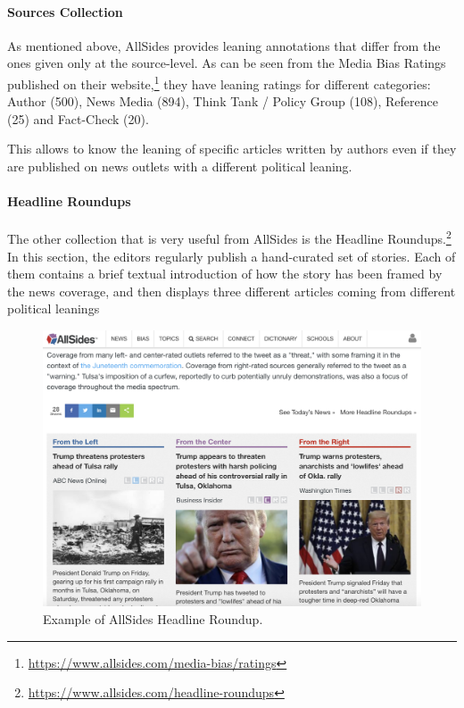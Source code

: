 \paragraph{Sources Collection}

As mentioned above, AllSides provides leaning annotations that differ from  the ones given only at the source-level.
As can be seen from the Media Bias Ratings published on their website,\footnote{\url{https://www.allsides.com/media-bias/ratings}} they have leaning ratings for different categories: Author (500), News Media (894), Think Tank / Policy Group (108), Reference (25) and Fact-Check (20).

This allows to know the leaning of specific articles written by authors even if they are published on news outlets with a different political leaning.


\paragraph{Headline Roundups\texttrademark}

The other collection that is very useful from AllSides is the Headline Roundups\texttrademark.\footnote{\url{https://www.allsides.com/headline-roundups}} In this section, the editors regularly publish a hand-curated set of stories. Each of them contains a brief textual introduction of how the story has been framed by the news coverage, and then displays three different articles coming from different political leanings


\begin{figure}[!htbp]
    \centering
    \includegraphics[width=\linewidth]{figures/allsides.png}
    \caption{Example of AllSides Headline Roundup.}
    \label{fig:allsides}
\end{figure}

